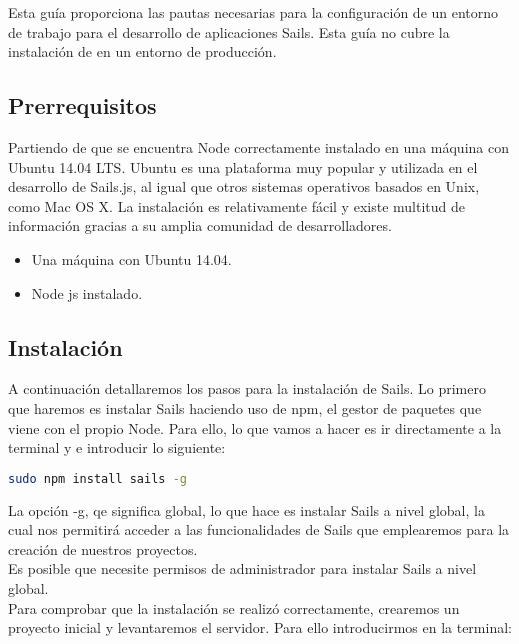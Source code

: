Esta guía proporciona las pautas necesarias para la configuración de un entorno de trabajo para el desarrollo de aplicaciones Sails. Esta guía no cubre la instalación de en un entorno de producción.\\

\subsection{Prerrequisitos}

Partiendo de que se encuentra Node correctamente instalado en una máquina con Ubuntu 14.04 LTS. Ubuntu es una plataforma muy popular y utilizada en el desarrollo de Sails.js, al igual que otros sistemas operativos basados ​​en Unix, como Mac OS X. La instalación es relativamente fácil y existe multitud de información gracias a su amplia comunidad de desarrolladores.\\

\begin{itemize}
\item{Una máquina con Ubuntu 14.04.}
\item{Node js instalado.}
\end{itemize}

\subsection{Instalación}

A continuación detallaremos los pasos para la instalación de Sails. Lo primero que haremos es instalar Sails haciendo uso de npm, el gestor de paquetes que viene con el propio Node. Para ello, lo que vamos a hacer es ir directamente a la terminal y e introducir lo siguiente:\\

\begin{lstlisting}[language=bash]
sudo npm install sails -g
\end{lstlisting}

La opción -g, qe significa global, lo que hace es instalar Sails a nivel global, la cual nos permitirá acceder a las funcionalidades de Sails que emplearemos para la creación de nuestros proyectos.\\

Es posible que necesite permisos de administrador para instalar Sails a nivel global.\\

Para comprobar que la instalación se realizó correctamente, crearemos un proyecto inicial y levantaremos el servidor. Para ello introducirmos en la terminal:\\

